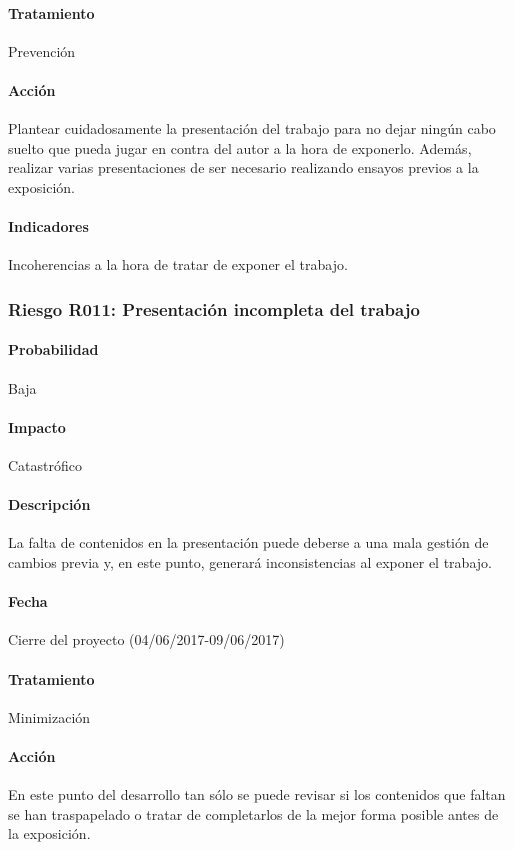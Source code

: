 \documentclass[10pt,a4paper]{article}
\begin{document}
				\paragraph{Tratamiento} Prevención
				\paragraph{Acción} Plantear cuidadosamente la presentación del trabajo para no dejar ningún cabo suelto que pueda jugar en contra del autor a la hora de exponerlo. Además, realizar varias presentaciones de ser necesario realizando ensayos previos a la exposición.
				\paragraph{Indicadores} Incoherencias a la hora de tratar de exponer el trabajo.					

			\subsubsection{Riesgo R011: Presentación incompleta del trabajo}
				\paragraph{Probabilidad} Baja
				\paragraph{Impacto}	Catastrófico
				\paragraph{Descripción} La falta de contenidos en la presentación puede deberse a una mala gestión de cambios previa y, en este punto, generará inconsistencias al exponer el trabajo.
				\paragraph{Fecha} Cierre del proyecto (04/06/2017-09/06/2017)
				\paragraph{Tratamiento} Minimización
				\paragraph{Acción} En este punto del desarrollo tan sólo se puede revisar si los contenidos que faltan se han traspapelado o tratar de completarlos de la mejor forma posible antes de la exposición.
\end{document}
